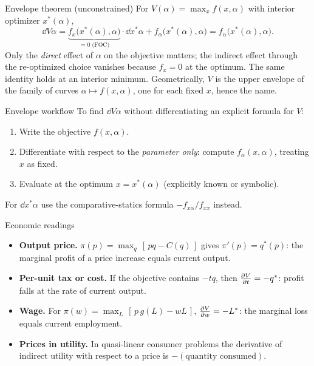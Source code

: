 \begin{rulebox}{Envelope theorem (unconstrained)}
For $V(\alpha)=\max_x f(x,\alpha)$ with interior optimizer $x^*(\alpha)$,
\[
  \dd{V}{\alpha}
  =\underbrace{f_x\bigl(x^*(\alpha),\alpha\bigr)}_{=0\text{ (FOC)}}
   \cdot\dd{x^*}{\alpha}
   +f_\alpha\bigl(x^*(\alpha),\alpha\bigr)
  =f_\alpha\bigl(x^*(\alpha),\alpha\bigr).
\]
Only the \emph{direct} effect of $\alpha$ on the objective matters; the
indirect effect through the re-optimized choice vanishes because $f_x=0$
at the optimum. The same identity holds at an interior minimum.
Geometrically, $V$ is the upper envelope of the
family of curves $\alpha\mapsto f(x,\alpha)$, one for each fixed $x$,
hence the name.
\end{rulebox}

\begin{rulebox}{Envelope workflow}
To find $\dd{V}{\alpha}$ without differentiating an explicit formula for
$V$:
\begin{enumerate}[leftmargin=1.6em,itemsep=0.3ex]
  \item Write the objective $f(x,\alpha)$.
  \item Differentiate with respect to the \emph{parameter only}:
        compute $f_\alpha(x,\alpha)$, treating $x$ as fixed.
  \item Evaluate at the optimum $x=x^*(\alpha)$ (explicitly known or
        symbolic).
\end{enumerate}
For $\dd{x^*}{\alpha}$ use the comparative-statics formula
$-f_{x\alpha}/f_{xx}$ instead.
\end{rulebox}

\begin{rulebox}{Economic readings}
\begin{itemize}[leftmargin=1.6em,itemsep=0.3ex]
  \item \textbf{Output price.} $\pi(p)=\max_q\,[\,pq-C(q)\,]$ gives
        $\pi'(p)=q^*(p)$: the marginal profit of a price increase equals
        current output.
  \item \textbf{Per-unit tax or cost.} If the objective contains $-tq$,
        then $\frac{\partial V}{\partial t}=-q^*$: profit falls at the rate of current
        output.
  \item \textbf{Wage.} For $\pi(w)=\max_L\,[\,p\,g(L)-wL\,]$,
        $\frac{\partial V}{\partial w}=-L^*$: the marginal loss equals current employment.
  \item \textbf{Prices in utility.} In quasi-linear consumer problems
        the derivative of indirect utility with respect to a price is
        $-(\text{quantity consumed})$.
\end{itemize}
\end{rulebox}

